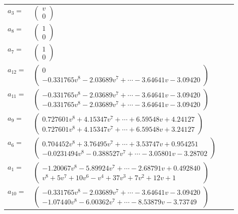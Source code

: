 \documentclass[1p]{elsarticle_modified}
\theoremstyle{definition}
\begin{document}
\begin{tabular}{m{7pt} m{180pt} m{7pt} m{180pt} }
\flushright $a_{3}=$&$\begin{pmatrix}v\\0\end{pmatrix}$ \\
\flushright $a_{8}=$&$\begin{pmatrix}1\\0\end{pmatrix}$ \\
\flushright $a_{7}=$&$\begin{pmatrix}1\\0\end{pmatrix}$ \\
\flushright $a_{12}=$&$\begin{pmatrix}0\\-0.331765 v^{8}-2.03689 v^{7}+\cdots-3.64641 v-3.09420\end{pmatrix}$ \\
\flushright $a_{11}=$&$\begin{pmatrix}-0.331765 v^{8}-2.03689 v^{7}+\cdots-3.64641 v-3.09420\\-0.331765 v^{8}-2.03689 v^{7}+\cdots-3.64641 v-3.09420\end{pmatrix}$ \\
\flushright $a_{9}=$&$\begin{pmatrix}0.727601 v^{8}+4.15347 v^{7}+\cdots+6.59548 v+4.24127\\0.727601 v^{8}+4.15347 v^{7}+\cdots+6.59548 v+3.24127\end{pmatrix}$ \\
\flushright $a_{6}=$&$\begin{pmatrix}0.704452 v^{8}+3.76495 v^{7}+\cdots+3.53747 v+0.954251\\-0.0231494 v^{8}-0.388527 v^{7}+\cdots-3.05801 v-3.28702\end{pmatrix}$ \\
\flushright $a_{1}=$&$\begin{pmatrix}-1.20067 v^{8}-5.89924 v^{7}+\cdots-2.68791 v+0.492840\\v^8+5 v^7+10 v^6- v^4+37 v^3+7 v^2+12 v+1\end{pmatrix}$ \\
\flushright $a_{10}=$&$\begin{pmatrix}-0.331765 v^{8}-2.03689 v^{7}+\cdots-3.64641 v-3.09420\\-1.07440 v^{8}-6.00362 v^{7}+\cdots-8.53879 v-3.73749\end{pmatrix}$ \\

\end{tabular}
\end{document}
